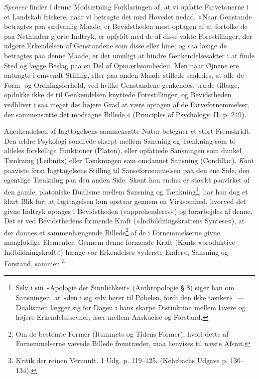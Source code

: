 \documentclass[12pt,a4paper,openany]{book}
\newcommand{\opage}[1]{\marginnote{\footnotesize\textit{[#1]}}}
\begin{document}
\emph{Spencer} finder i denne Modsætning Forklaringen af, at vi opfatte
Farvetonerne i et Landskab friskere, naar vi betragte det med Hovedet
nedad. »Naar Genstande betragtes paa sædvanlig Maade, er Bevidstheden
mest optagen af at fortolke de paa Nethinden gjorte Indtryk, er opfyldt
med de af disse vakte Forestillinger, der udgøre Erkendelsen af
Genstandene som disse eller hine; og saa længe de betragtes paa denne
Maade, er det umuligt at hindre Genkendelsesakter i at finde Sted og
lægge Beslag paa en Del af Opmærksomheden. Men naar Øjnene ere anbragte
i omvendt Stilling, eller paa anden Maade stillede saaledes, at alle de
Form- og Ordningsforhold, ved hvilke Genstandene genkendes, træde
tilbage, opdukke ikke de til Genkendelsen knyttede Forestillinger, og
Bevidstheden vedbliver i saa meget des højere Grad at være optagen af de
Farvefornemmelser, der sammensætte det modtagne Billede.« (Principles of
Psychology. II. p. 249).

Anerkendelsen af Iagttagelsens sammensatte Natur betegner et stort
Fremskridt. Den ældre Psykologi sondrede skarpt mellem Sansning og
Tænkning som to aldeles forskellige Funktioner (Platon), eller opfattede
Sansningen som dunkel Tænkning (Leibnitz) eller Tænkningen som omdannet
Sansning (Condillac). \emph{Kant} paaviste først Iagttagelsens Stilling
til Sansefornemmelsen paa den ene Side, den egentlige Tænkning paa den
anden Side. Skønt han endnu er stærkt paavirket af
\opage{159}den gamle, platoniske Dualisme mellem Sansning og
Tænkning\footnote[1]{Selv i sin »Apologie der Sinnlichkeit«
(Anthropologie § 8) siger han om Sansningen, at »den i sig selv hører
til Pøbelen, fordi den ikke tænker«. --- Dualismen lægger sig for Dagen
i hans skarpe Distinktion mellem lavere og højere Erkendelsesevner, især
mellem Anskuelse og Forstand.}, har han dog et klart Blik for, at
Iagttagelsen kun opstaar gennem en Virksomhed, hvorved det givne Indtryk
optages i Bevidstheden (»apprehenderes«) og forarbejdes af denne. Det er
ved Bevidsthedens formende Kraft (»Indbildningskraftens Syntese«), at
der dannes et sammenhængende Billede\footnote[2]{Om de bestemte Former
(Rummets og Tidens Former), hvori dette af Fornemmelserne vævede Billede
fremtræder, maa henvises til næste Afsnit.} af de i Fornemmelserne givne
mangfoldige Elementer. Gennem denne formende Kraft (Kants »produktive
Indbildningskraft«) hænge vor Erkendelses »yderste Ender«, Sansning og
Forstand, sammen.\footnote[3]{Kritik der reinen Vernunft. 1 Udg. p.
119--125. (Kehrbachs Udgave p. 130--134).}
\end{document}
